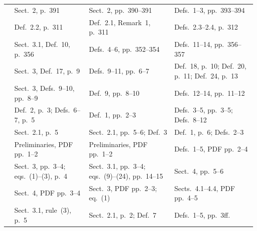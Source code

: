 {\begin{longtable}{@{}p{}p{}p{}p{}@{}}
            \cite{LoyerS09}             & Sect.~2, p.~391                                       & Sect.~2, pp.~390--391                           & Defs.~1--3, pp.~393--394                                           \\
            \cite{MadridO12}            & Def.~2.2, p.~311                                      & Def.~2.1, Remark~1, p.~311                      & Defs.~2.3--2.4, p.~312                                             \\
            \cite{MedinaOV01}           & Sect.~3.1, Def.~10, p.~356                            & Defs.~4--6, pp.~352--354                        & Defs.~11--14, pp.~356--357                                         \\
            \cite{CornejoLM18}          & Sect.~3, Def.~17, p.~9                                & Defs.~9--11, pp.~6--7                           & Def.~18, p.~10; Def.~20, p.~11; Def.~24, p.~13                     \\
            \cite{CornejoLM20}          & Sect.~3, Defs.~9--10, pp.~8--9                        & Def.~9, pp.~8--10                               & Defs.~12--14, pp.~11--12                                           \\
            \cite{CornejoLM20math}      & Def.~2, p.~3; Defs.~6--7, p.~5                        & Def.~1, pp.~2--3                                & Defs.~3--5, pp.~3--5; Defs.~8--12                                  \\
            \cite{HeyninckAB22arxiv}    & Sect.~2.1, p.~5                                       & Sect.~2.1, pp.~5--6; Def.~3                     & Def.~1, p.~6; Defs.~2--3                                           \\
            \cite{PelovT04}             & Preliminaries, PDF pp.~1--2                           & Preliminaries, PDF pp.~1--2                     & Defs.~1--5, PDF pp.~2--4                                           \\
            \cite{RiegelEtAl20}         & Sect.~3, pp.~3--4; eqs.~(1)--(3), p.~4                & Sect.~3.1, pp.~3--4; eqs.~(9)--(24), pp.~14--15 & Sect.~4, pp.~5--6                                                  \\
            \cite{SenCRG22}             & Sect.~4, PDF pp.~3--4                                 & Sect.~3, PDF pp.~2--3; eq.~(1)                  & Sects.~4.1--4.4, PDF pp.~4--5                                      \\
            \cite{Antic24}              & Sect.~3.1, rule~(3), p.~5                             & Sect.~2.1, p.~2; Def.~7                         & Defs.~1--5, pp.~3ff.                                               \\

\end{longtable}}
